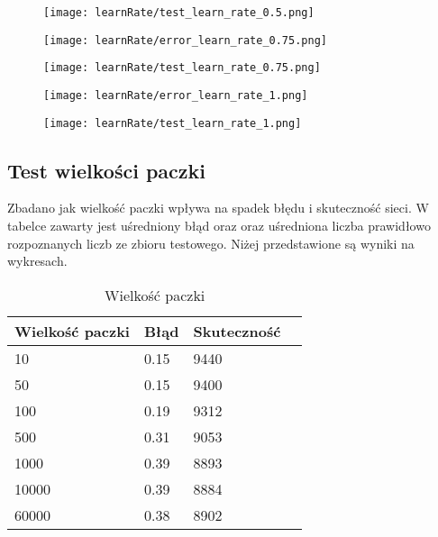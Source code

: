 \documentclass{article}
\begin{document}
\begin{figure}[]
  \centering
  \texttt{[image: learnRate/test\_learn\_rate\_0.5.png]}
\end{figure}

\begin{figure}[]
  \centering
  \texttt{[image: learnRate/error\_learn\_rate\_0.75.png]}
\end{figure}

\begin{figure}[]
  \centering
  \texttt{[image: learnRate/test\_learn\_rate\_0.75.png]}
\end{figure}

\begin{figure}[]
  \centering
  \texttt{[image: learnRate/error\_learn\_rate\_1.png]}
\end{figure}

\begin{figure}[]
  \centering
  \texttt{[image: learnRate/test\_learn\_rate\_1.png]}
\end{figure}


\newpage
\subsection{Test wielkości paczki}

Zbadano jak wielkość paczki wpływa na spadek błędu i skuteczność sieci. W tabelce zawarty jest uśredniony błąd oraz oraz uśredniona liczba prawidłowo rozpoznanych
liczb ze zbioru testowego. Niżej przedstawione są wyniki na wykresach.

\begin{table}[h]
  \centering
    
  \bgroup
  \def\arraystretch{1.3}
  \begin{tabular}{|l|l|l|l|}
  \hline
  Wielkość paczki & Błąd & Skuteczność \\ \hline
  10 & 0.15 & 9440 \\ \hline
  50 & 0.15 & 9400 \\ \hline
  100 & 0.19 & 9312 \\ \hline
  500 & 0.31 & 9053 \\ \hline
  1000 & 0.39 & 8893 \\ \hline
  10000 & 0.39 & 8884 \\ \hline
  60000 & 0.38 & 8902 \\ \hline
  \end{tabular}
  \egroup
  \vspace{10pt}
  \caption{Wielkość paczki}
\end{table}
\end{document}
